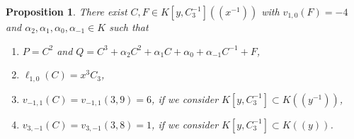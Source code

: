 \documentclass[reqno,a4paper,twoside]{amsart}
\newtheorem{proposition}[theorem]{Proposition}
\theoremstyle{definition}
\theoremstyle{remark}
\begin{document}
\begin{proposition}\label{calculo de C}
 There exist $C,F\in K[y,C_3^{-1}]((x^{-1}))$
with $v_{1,0}(F)=-4$ and $\alpha_2,\alpha_1,\alpha_0,\alpha_{-1}\in K$ such that
  \begin{enumerate}
    \item $P=C^2$ and $Q=C^3 +\alpha_2 C^2+\alpha_1 C+\alpha_0+\alpha_{-1}C^{-1}+F$,
    \item $\ell_{1,0}(C)=x^3 C_3$,
    \item $v_{-1,1}(C)=v_{-1,1}(3,9)=6$, if we consider $K[y,C_3^{-1}]\subset K((y^{-1}))$,
  \item $v_{3,-1}(C)=v_{3,-1}(3,8)=1$, if we consider $K[y,C_3^{-1}]\subset K((y))$.
  \end{enumerate}
\end{proposition}
\end{document}
